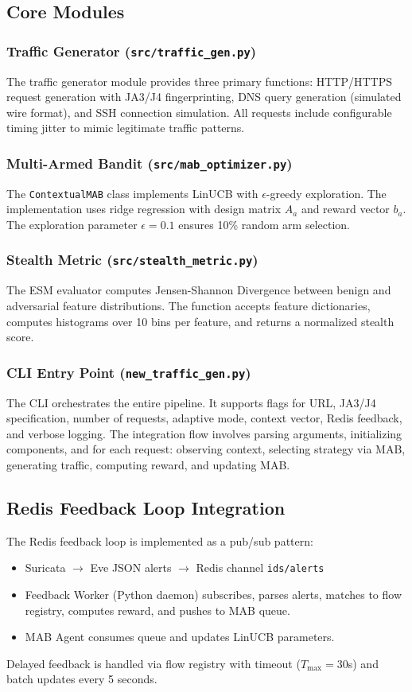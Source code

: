 \documentclass[review]{elsarticle}
\begin{document}
\subsection{Core Modules}
\subsubsection{Traffic Generator (\texttt{src/traffic\_gen.py})}
The traffic generator module provides three primary functions: HTTP/HTTPS request generation with JA3/J4 fingerprinting, DNS query generation (simulated wire format), and SSH connection simulation. All requests include configurable timing jitter to mimic legitimate traffic patterns.

\subsubsection{Multi-Armed Bandit (\texttt{src/mab\_optimizer.py})}
The \texttt{ContextualMAB} class implements LinUCB with $\epsilon$-greedy exploration. The implementation uses ridge regression with design matrix $A_a$ and reward vector $b_a$. The exploration parameter $\epsilon = 0.1$ ensures 10\% random arm selection.

\subsubsection{Stealth Metric (\texttt{src/stealth\_metric.py})}
The ESM evaluator computes Jensen-Shannon Divergence between benign and adversarial feature distributions. The function accepts feature dictionaries, computes histograms over 10 bins per feature, and returns a normalized stealth score.

\subsubsection{CLI Entry Point (\texttt{new\_traffic\_gen.py})}
The CLI orchestrates the entire pipeline. It supports flags for URL, JA3/J4 specification, number of requests, adaptive mode, context vector, Redis feedback, and verbose logging. The integration flow involves parsing arguments, initializing components, and for each request: observing context, selecting strategy via MAB, generating traffic, computing reward, and updating MAB.

\subsection{Redis Feedback Loop Integration}
The Redis feedback loop is implemented as a pub/sub pattern:
\begin{itemize}
\item Suricata $\rightarrow$ Eve JSON alerts $\rightarrow$ Redis channel \texttt{ids/alerts}
\item Feedback Worker (Python daemon) subscribes, parses alerts, matches to flow registry, computes reward, and pushes to MAB queue.
\item MAB Agent consumes queue and updates LinUCB parameters.
\end{itemize}
Delayed feedback is handled via flow registry with timeout ($T_{\max} = 30$s) and batch updates every 5 seconds.
\end{document}
